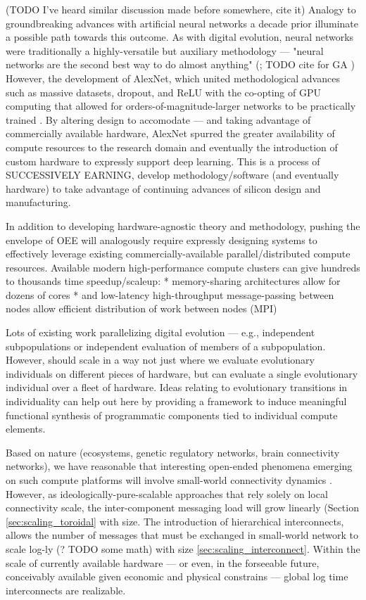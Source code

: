 (TODO I've heard similar discussion made before somewhere, cite it)
Analogy to groundbreaking advances with artificial neural networks a decade prior illuminate a possible path towards this outcome.
As with digital evolution, neural networks were traditionally a highly-versatile but auxiliary methodology --- "neural networks are the second best way to do almost anything" (\citep{miaoulis2008intelligent}; TODO cite for GA \citep{eiben2015introduction})
However, the development of AlexNet, which united methodological advances such as massive datasets, dropout, and ReLU with the co-opting of GPU computing that allowed for orders-of-magnitude-larger networks to be practically trained \citep{krizhevsky2012imagenet}.
By altering design to accomodate --- and taking advantage of commercially available hardware, AlexNet spurred the greater availability of compute resources to the research domain and eventually the introduction of custom hardware to expressly support deep learning.
This is a process of SUCCESSIVELY EARNING, develop methodology/software (and eventually hardware) to take advantage of continuing advances of silicon design and manufacturing.

In addition to developing hardware-agnostic theory and methodology, pushing the envelope of OEE will analogously require expressly designing systems to effectively leverage existing commercially-available parallel/distributed compute resources.
Available modern high-performance compute clusters can give hundreds to thousands time speedup/scaleup:
* memory-sharing architectures allow for dozens of cores \citep{dagum1998openmp}
* and low-latency high-throughput message-passing between nodes allow efficient distribution of work between nodes  (MPI) \citep{clarke1994mpi}

Lots of existing work parallelizing digital evolution --- e.g., independent subpopulations or independent evaluation of members of a subpopulation.
However, should scale in a way not just where we evaluate evolutionary individuals on different pieces of hardware, but can evaluate a single evolutionary individual over a fleet of hardware.
Ideas relating to evolutionary transitions in individuality can help out here by providing a framework to induce meaningful functional synthesis of programmatic components tied to individual compute elements.

Based on nature (ecosystems, genetic regulatory networks, brain connectivity networks), we have reasonable  that interesting open-ended phenomena emerging on such compute platforms will involve small-world \citep{watts1998collective} connectivity dynamics \citep{bassett2017small} \citep{fox2014herbivores} \citep{gaiteri2014beyond}.
However, as ideologically-pure-scalable approaches that rely solely on local connectivity scale, the inter-component messaging load will grow linearly (Section \ref{sec:scaling_toroidal} with size.
The introduction of hierarchical interconnects, allows the number of messages that must be exchanged in small-world network to scale log-ly (? TODO some math) with size \ref{sec:scaling_interconnect}.
Within the scale of currently available hardware --- or even, in the forseeable future, conceivably available given economic and physical constrains --- global log time interconnects are realizable.

